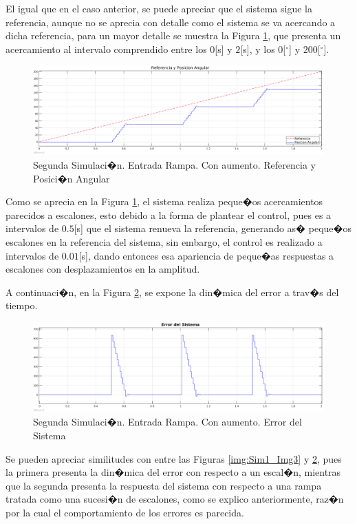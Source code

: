 \documentclass[10pt,a4paper]{book}
\begin{document}
El igual que en el caso anterior, se puede apreciar que el sistema sigue la referencia, aunque no se aprecia con detalle como el sistema se va acercando a dicha referencia, para un mayor detalle se muestra la Figura \ref{img:Sim2_Img2}, que presenta un acercamiento al intervalo comprendido entre los $0$[s] y $2$[s], y los $0$[$^\circ$] y $200$[$^\circ$].

\begin{figure}[H]
	\centering
		\includegraphics[scale=0.3]{Imagenes/SRD/Sim2_Img2.png}
	\caption{Segunda Simulaci�n. Entrada Rampa. Con aumento. Referencia y Posici�n Angular}
	\label{img:Sim2_Img2}
\end{figure}

Como se aprecia en la Figura \ref{img:Sim2_Img2}, el sistema realiza peque�os acercamientos parecidos a escalones, esto debido a la forma de plantear el control, pues es a intervalos de $0.5$[s] que el sistema renueva la referencia, generando as� peque�os escalones en la referencia del sistema, sin embargo, el control es realizado a intervalos de $0.01$[s], dando entonces esa apariencia de peque�as respuestas a escalones con desplazamientos en la amplitud.

A continuaci�n, en la Figura \ref{img:Sim2_Img3}, se expone la din�mica del error a trav�s del tiempo.

\begin{figure}[H]
	\centering
		\includegraphics[scale=0.3]{Imagenes/SRD/Sim2_Img3.png}
	\caption{Segunda Simulaci�n. Entrada Rampa. Con aumento. Error del Sistema}
	\label{img:Sim2_Img3}
\end{figure}

Se pueden apreciar similitudes con entre las Figuras \ref{img:Sim1_Img3} y \ref{img:Sim2_Img3}, pues la primera presenta la din�mica del error con respecto a un escal�n, mientras que la segunda presenta la respuesta del sistema con respecto a una rampa tratada como una sucesi�n de escalones, como se explico anteriormente, raz�n por la cual el comportamiento de los errores es parecida.
\end{document}
